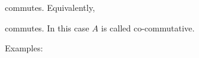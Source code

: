 \documentclass{article}
\theoremstyle{definition}
\numberwithin{theorem}{subsection}
\begin{document}
    \begin{center}
    \end{center}

    commutes. Equivalently,

    \begin{center}
    \end{center}

    commutes. In this case \(A\) is called co-commutative.

    Examples:
\end{document}

